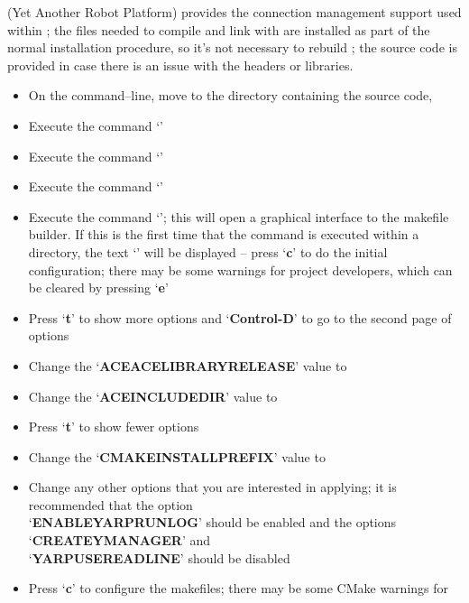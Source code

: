 \tertiaryEnd{}
\TBD{}
\tertiaryEnd{}
\TBD{}
\tertiaryEnd{}
\secondaryEnd{}
\textbf{\yarp} (Yet Another Robot Platform) provides the connection management support
used within \mplusm{}; the files needed to compile and link with \yarp{} are installed as
part of the normal \mplusm{} installation procedure, so it's not necessary to rebuild
\yarp{}; the source code is provided in case there is an issue with the headers or
libraries.
\begin{itemize}
\item On the command--line, move to the directory containing the \mplusm{} source code,
\item Execute the command `'
\item Execute the command `'
\item Execute the command `'
\item Execute the command `'; this will open a graphical interface to
the makefile builder. If this is the first time that the command is executed within a
directory, the text `' will be displayed -- press `\textbf{c}' to do
the initial configuration; there may be some warnings for project developers, which can be
cleared by pressing `\textbf{e}'
\item Press `\textbf{t}' to show more options and `\textbf{Control-D}' to go to the second
page of options
\item Change the `\textbf{ACE\fUS{}ACE\fUS{}LIBRARY\fUS{}RELEASE}' value to
\item Change the `\textbf{ACE\fUS{}INCLUDE\fUS{}DIR}' value to 
\item Press `\textbf{t}' to show fewer options
\item Change the `\textbf{CMAKE\fUS{}INSTALL\fUS{}PREFIX}' value to 
\item Change any other options that you are interested in applying; it is recommended that
the option\\
`\textbf{ENABLE\fUS{}YARPRUN\fUS{}LOG}' should be enabled and the options
`\textbf{CREATE\fUS{}YMANAGER}' and\\
`\textbf{YARP\fUS{}USE\fUS{}READLINE}' should be disabled
\item Press `\textbf{c}' to configure the makefiles; there may be some CMake warnings for

\end{itemize}
